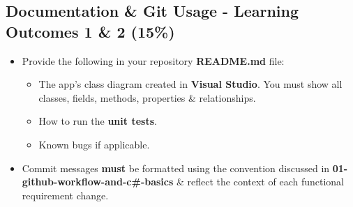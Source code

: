 \documentclass{article}
\begin{document}
\subsection*{Documentation \& Git Usage - Learning Outcomes 1 \& 2 (15\%)}
\begin{itemize}
    \item Provide the following in your repository \textbf{README.md} file:
    \begin{itemize}
        \item The app's class diagram created in \textbf{Visual Studio}. You must show all classes, fields, methods, properties \& relationships.
        \item How to run the \textbf{unit tests}.
        \item Known bugs if applicable.
    \end{itemize}
    \item Commit messages \textbf{must} be formatted using the convention discussed in \textbf{01-github-workflow-and-c\#-basics} \& reflect the context of each functional requirement change.
\end{itemize}
\end{document}
